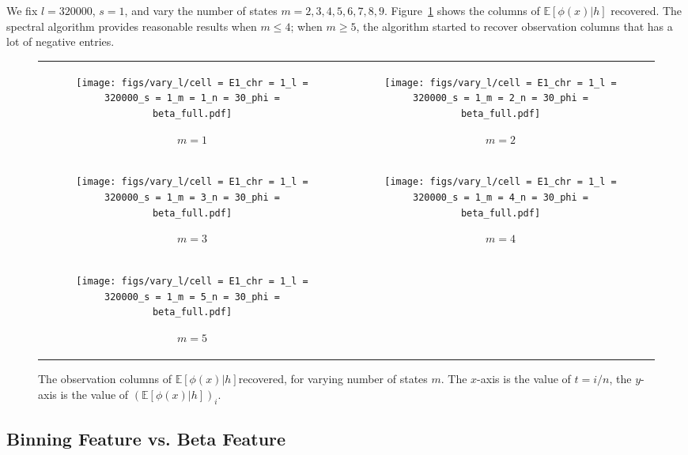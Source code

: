 \documentclass{article}
\def\E{\mathbb{E}}
\begin{document}
We fix $l = 320000$, $s = 1$, and vary the number of states $m = 2,3,4,5,6,7,8,9$. Figure~\ref{fig:varym} shows the columns of $\E[\phi(x)|h]$ recovered. The spectral algorithm provides reasonable results when $m \leq 4$; when $m \geq 5$, the algorithm started to recover observation columns that has a lot of negative entries.


\begin{figure}[H]

    \begin{tabular}{cc}
    \begin{subfigure}[t]{0.45\textwidth}
        \texttt{[image: figs/vary\_l/cell = E1\_chr = 1\_l = 320000\_s = 1\_m = 1\_n = 30\_phi = beta\_full.pdf]}
        \caption{$m = 1$}
    \end{subfigure}
    &
    \begin{subfigure}[t]{0.45\textwidth}
        \texttt{[image: figs/vary\_l/cell = E1\_chr = 1\_l = 320000\_s = 1\_m = 2\_n = 30\_phi = beta\_full.pdf]}
        \caption{$m = 2$}
    \end{subfigure}
    \\
    \begin{subfigure}[t]{0.45\textwidth}
        \texttt{[image: figs/vary\_l/cell = E1\_chr = 1\_l = 320000\_s = 1\_m = 3\_n = 30\_phi = beta\_full.pdf]}
        \caption{$m = 3$}
    \end{subfigure}
    &
    \begin{subfigure}[t]{0.45\textwidth}
        \texttt{[image: figs/vary\_l/cell = E1\_chr = 1\_l = 320000\_s = 1\_m = 4\_n = 30\_phi = beta\_full.pdf]}
        \caption{$m = 4$}
    \end{subfigure}
    \\
    \begin{subfigure}[t]{0.45\textwidth}
        \texttt{[image: figs/vary\_l/cell = E1\_chr = 1\_l = 320000\_s = 1\_m = 5\_n = 30\_phi = beta\_full.pdf]}
        \caption{$m = 5$}
    \end{subfigure}
    \end{tabular}

    \caption{The observation columns of $\E[\phi(x)|h]$recovered, for varying number of states $m$. The $x$-axis is the value of $t = i/n$, the $y$-axis is the value of $(\E[\phi(x)|h])_i$.}
    \label{fig:varym}
\end{figure}

\subsection{Binning Feature vs. Beta Feature}
\end{document}
